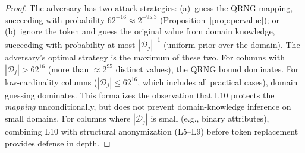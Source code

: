 \documentclass[journal]{IEEEtran}
\begin{document}
\begin{proof}
The adversary has two attack strategies: (a)~guess the QRNG mapping, succeeding with probability $62^{-16} \approx 2^{-95.3}$ (Proposition~\ref{prop:pervalue}); or (b)~ignore the token and guess the original value from domain knowledge, succeeding with probability at most $|\mathcal{D}_j|^{-1}$ (uniform prior over the domain). The adversary's optimal strategy is the maximum of these two. For columns with $|\mathcal{D}_j| > 62^{16}$ (more than ${\approx}2^{95}$ distinct values), the QRNG bound dominates. For low-cardinality columns ($|\mathcal{D}_j| \leq 62^{16}$, which includes all practical cases), domain guessing dominates. This formalizes the observation that L10 protects the \emph{mapping} unconditionally, but does not prevent domain-knowledge inference on small domains. For columns where $|\mathcal{D}_j|$ is small (e.g., binary attributes), combining L10 with structural anonymization (L5--L9) before token replacement provides defense in depth.
\end{proof}
\end{document}
